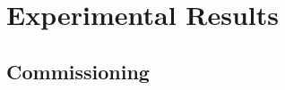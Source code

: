\chapter{Experimental Results}
\label{chap:results}

\setcounter{section}{0}
\setcounter{subsection}{0}

\label{sec:performance}

\FloatBarrier  %

% 



\section{Commissioning}
